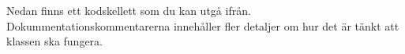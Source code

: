 \noindent Nedan finns ett kodskellett som du kan utgå ifrån. Dokummentationskommentarerna innehåller fler detaljer om hur det är tänkt att klassen ska fungera. %

\begin{figure}[H]
\label{code:classes:graphics:rectanglesequence}
\end{figure}



